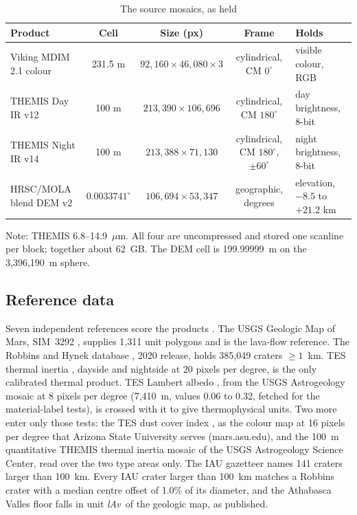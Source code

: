 \documentclass[twocolumn]{aastex701}
\newcommand{\pmsixty}{$\pm60^{\circ}$}
\newcommand{\lAv}{\textit{lAv}}
\begin{document}
\begin{table}[t]
\centering
\caption{The source mosaics, as held \label{tab:data}}
\small
\setlength{\tabcolsep}{4.5pt}
\begin{tabular}{lcccl}
\hline\hline
Product & Cell & Size (px) & Frame & Holds \\
\hline
Viking MDIM 2.1 colour & 231.5 m & $92{,}160\times46{,}080\times3$ & cylindrical, CM $0^{\circ}$ & visible colour, RGB \\
THEMIS Day IR v12 & 100 m & $213{,}390\times106{,}696$ & cylindrical, CM $180^{\circ}$ & day brightness, 8-bit \\
THEMIS Night IR v14 & 100 m & $213{,}388\times71{,}130$ & cylindrical, CM $180^{\circ}$, \pmsixty & night brightness, 8-bit \\
HRSC/MOLA blend DEM v2 & $0.0033741^{\circ}$ & $106{,}694\times53{,}347$ & geographic, degrees & elevation, $-8.5$ to $+21.2$ km \\
\hline
\end{tabular}
\par\vspace{3pt}\noindent\parbox{\textwidth}{\footnotesize Note: THEMIS 6.8--14.9~$\mu$m. All four are uncompressed and stored one scanline per block; together about 62~GB. The DEM cell is 199.99999~m on the 3,396,190~m sphere.}
\end{table}

\subsection{Reference data}

Seven independent references score the products \citep{Congalton1991}. The USGS Geologic Map of Mars, SIM~3292
\citep{Tanaka2014}, supplies 1,311 unit polygons and is the lava-flow reference. The Robbins and Hynek database
\citep{Robbins2012}, 2020 release, holds 385,049 craters $\ge1$~km. TES thermal inertia \citep{Christensen2001, Putzig2007}, dayside and
nightside at 20 pixels per degree, is the only calibrated thermal product. TES Lambert albedo
\citep{Christensen2001}, from the USGS Astrogeology mosaic at 8 pixels per degree (7,410~m, values 0.06 to 0.32,
fetched for the material-label tests), is crossed with it to give thermophysical units. Two more enter only those
tests: the TES dust cover index \citep{Ruff2002}, as the colour map at 16 pixels per degree that Arizona State
University serves (mars.asu.edu), and the 100~m quantitative THEMIS thermal inertia mosaic \citep{Fergason2006} of the
USGS Astrogeology Science Center, read over the two type areas only. The IAU gazetteer \citep{Gazetteer} names
141 craters larger than 100~km. Every IAU crater larger than 100~km matches a Robbins crater with a median centre
offset of 1.0\% of its diameter, and the Athabasca Valles floor falls in unit \lAv\ of the geologic map, as
published. %
\end{document}
